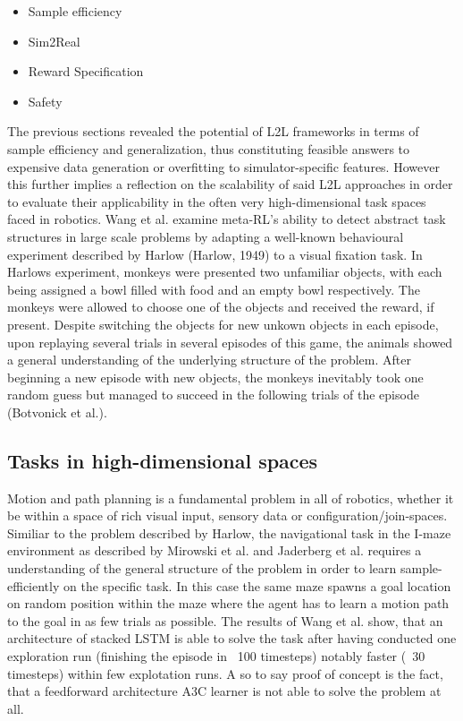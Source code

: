 \documentclass[letterpaper, 10 pt, conference]{ieeeconf}  %
\begin{document}
\begin{itemize}
        \item Sample efficiency
        \item Sim2Real
        \item Reward Specification
        \item Safety
\end{itemize}   

The previous sections revealed the potential of L2L frameworks in terms of sample efficiency and generalization, thus constituting 
feasible answers to expensive data generation or overfitting to simulator-specific features. However this further implies a 
reflection on the scalability of said L2L approaches in order to evaluate their applicability in the often very
high-dimensional task spaces faced in robotics. \newline
Wang et al. examine meta-RL's ability to detect abstract task structures in large scale problems by adapting a well-known behavioural experiment 
described by Harlow (Harlow, 1949) to a visual fixation task. In Harlows experiment, monkeys were presented two unfamiliar objects, with each being 
assigned a bowl filled with food and an empty bowl respectively. The monkeys were allowed to choose one of the objects and received the reward, if present. 
Despite switching the objects for new unkown objects in each episode, upon replaying several trials in several episodes of this game, the animals showed
a general understanding of the underlying structure of the problem. After beginning a new episode with new objects, the monkeys inevitably took 
one random guess but managed to succeed in the following trials of the episode (Botvonick et al.). \newline

\subsection{Tasks in high-dimensional spaces}

Motion and path planning is a fundamental problem in all of robotics, whether it be within a space of rich visual input, sensory data or
configuration/join-spaces. Similiar to the problem described by Harlow, the navigational task in the I-maze environment as described by 
Mirowski et al. and Jaderberg et al. requires a understanding of the general structure of the problem in order to learn sample-efficiently 
on the specific task. In this case the same maze spawns a goal location on random position within the maze where the agent has to learn
a motion path to the goal in as few trials as possible. The results of Wang et al. show, that an architecture of stacked LSTM is able to 
solve the task after having conducted one exploration run (finishing the episode in ~100 timesteps) notably faster (~30 timesteps) within few
explotation runs. A so to say proof of concept is the fact, that a feedforward architecture A3C learner is not able to solve the problem at all. 
 
\end{document}
